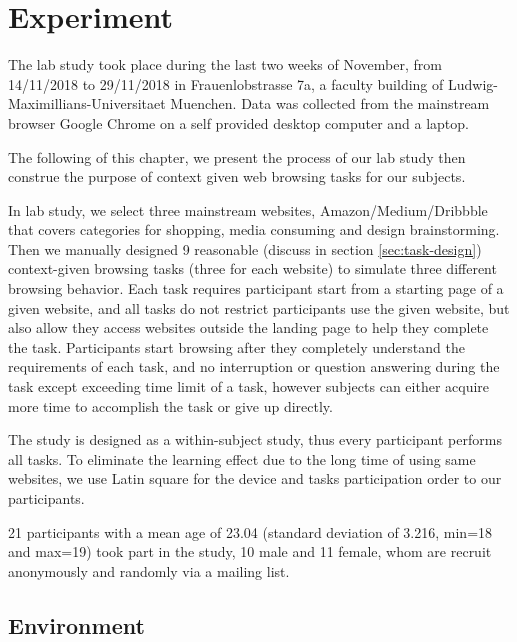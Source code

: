 \section{Experiment}
\label{ch:exp}

The lab study took place during the last two weeks of November, from 14/11/2018 to 29/11/2018
in Frauenlobstrasse 7a, a faculty building of Ludwig-Maximillians-Universitaet Muenchen.
Data was collected from the mainstream browser Google Chrome on a self provided 
desktop computer and a laptop.

The following of this chapter, we present the process of our lab study then construe the purpose of context given web browsing tasks for our subjects.


In lab study, we select three mainstream websites, Amazon/Medium/Dribbble 
that covers categories for shopping, media consuming and design brainstorming. 
Then we manually designed 9 reasonable (discuss in section \ref{sec:task-design})
context-given browsing tasks (three for each website) to simulate three different browsing behavior.
Each task requires participant start from a starting page of a given website, and
all tasks do not restrict participants use the given website, but also allow they 
access websites outside the landing page to help they complete the task.
Participants start browsing after they completely understand the requirements of each task,
and no interruption or question answering during the task
except exceeding time limit of a task, however subjects can either acquire more time to accomplish
the task or give up directly.

The study is designed as a within-subject study, thus every participant performs all tasks.
To eliminate the learning effect due to the long time of using same websites, 
we use Latin square \cite{cochran1950experimental} 
for the device and tasks participation order to our participants.

21 participants with a mean age of 23.04 (standard deviation of 3.216, min=18 and max=19) 
took part in the study, 10 male and 11 female, whom are recruit anonymously and randomly via a mailing list.

\subsection{Environment}


